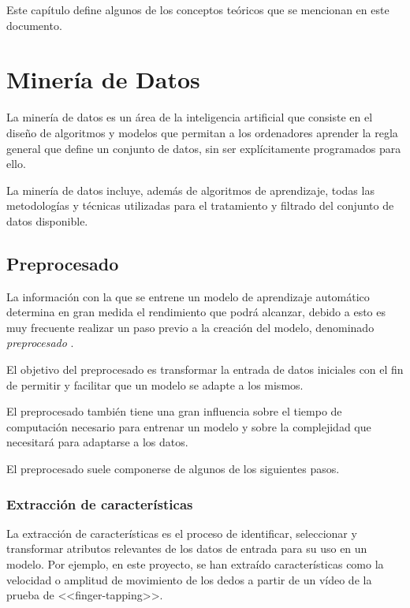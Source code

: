 \label{cha:Conceptos teóricos}

Este capítulo define algunos de los conceptos teóricos que se mencionan en este
documento.

\section{Minería de Datos}

La minería de datos es un área de la inteligencia artificial que consiste en el
diseño de algoritmos y modelos que permitan a los ordenadores aprender la regla
general que define un conjunto de datos, sin ser explícitamente programados para
ello.

La minería de datos incluye, además de algoritmos de aprendizaje, todas las
metodologías y técnicas utilizadas para el tratamiento y filtrado del conjunto
de datos disponible.

\subsection{Preprocesado}

La información con la que se entrene un modelo de aprendizaje automático
determina en gran medida el rendimiento que podrá alcanzar, debido a esto es muy
frecuente realizar un paso previo a la creación del modelo, denominado
\textit{preprocesado} \cite{enwiki:1138293751}.

El objetivo del preprocesado es transformar la entrada de datos iniciales con el
fin de permitir y facilitar que un modelo se adapte a los mismos.

El preprocesado también tiene una gran influencia sobre el tiempo de computación
necesario para entrenar un modelo y sobre la complejidad que necesitará para
adaptarse a los datos.

El preprocesado suele componerse de algunos de los siguientes pasos.

\subsubsection{Extracción de características}

La extracción de características es el proceso de identificar, seleccionar y
transformar atributos relevantes de los datos de entrada para su uso en un
modelo. Por ejemplo, en este proyecto, se han extraído características como la
velocidad o amplitud de movimiento de los dedos a partir de un vídeo de la
prueba de <<finger-tapping>>.

